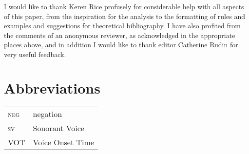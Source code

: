 \documentclass[output=paper]{LSP/langsci}
\begin{document}
I would like to thank Keren Rice profusely for considerable help with all aspects of this paper, from the inspiration for the analysis to the formatting of rules and examples and suggestions for theoretical bibliography. I have also profited from the comments of an anonymous reviewer, as acknowledged in the appropriate places above, and in addition I would like to thank editor Catherine Rudin for very useful feedback.

\section*{Abbreviations}
\begin{tabularx}{.45\textwidth}{lX}
\textsc{neg} & {negation}\\
\textsc{sv} & Sonorant Voice\\
VOT & Voice Onset Time\\
\end{tabularx}


{\sloppy
\printbibliography[heading=subbibliography,notkeyword=this]
 }
\end{document}
